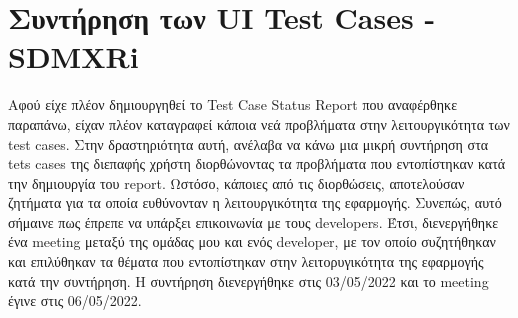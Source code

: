 \section {Συντήρηση των UI Test Cases - SDMXRi}
Αφού είχε πλέον δημιουργηθεί το Test Case Status Report που αναφέρθηκε παραπάνω, είχαν πλέον καταγραφεί κάποια νεά προβλήματα στην λειτουργικότητα 
των test cases. Στην δραστηριότητα αυτή, ανέλαβα να κάνω μια μικρή συντήρηση στα tets cases της διεπαφής χρήστη διορθώνοντας τα προβλήματα 
που εντοπίστηκαν κατά την δημιουργία του report. Ωστόσο, κάποιες από τις διορθώσεις, αποτελούσαν ζητήματα για τα οποία ευθύνονταν η λειτουργικότητα της 
εφαρμογής. Συνεπώς, αυτό σήμαινε πως έπρεπε να υπάρξει επικοινωνία με τους developers. Έτσι, διενεργήθηκε ένα meeting μεταξύ της ομάδας μου 
και ενός developer, με τον οποίο συζητήθηκαν και επιλύθηκαν τα θέματα που εντοπίστηκαν στην λειτορυγικότητα της εφαρμογής κατά την συντήρηση.
Η συντήρηση διενεργήθηκε στις 03/05/2022 και το meeting έγινε στις 06/05/2022.